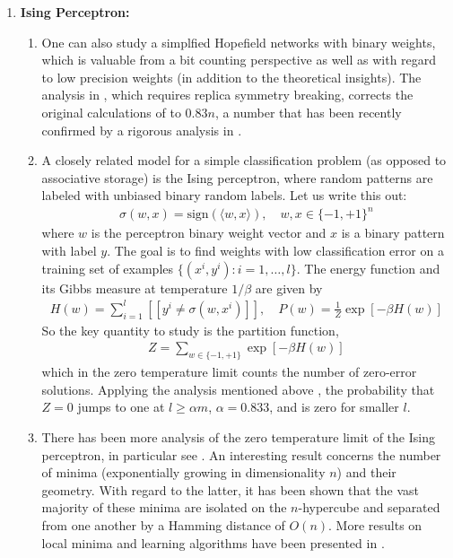 \documentclass[10pt,a4pape]{article}
\begin{document}
\begin{enumerate}
\begin{enumerate}
\end{enumerate}
\item {\textbf{Ising Perceptron:}} 
\begin{enumerate}
\item 
One can also study a simplfied Hopefield networks with binary weights, which is valuable from a bit counting perspective as well as with regard to low precision weights (in addition to the theoretical insights). The analysis in \cite{krauth1989storage}, which requires replica symmetry breaking, corrects the original calculations of  \cite{gardner1988optimal} to $0.83n$, a number that has been recently confirmed by a rigorous analysis in \cite{ding2018capacity}. 
\item A closely related model for a simple classification problem (as opposed to associative storage) is the Ising perceptron, where random patterns are labeled with unbiased binary random labels. Let us write this out:
\begin{align}
\sigma(w,x) = \text{sign}(\langle w,x\rangle), \quad w,x \in \{-1,+1\}^n
\end{align}
where $w$ is the perceptron binary weight vector and $x$ is a binary pattern with label $y$. The goal is to find weights with low classification error on a training set of examples $\{(x^i,y^i): i=1,\dots,l\}$. The energy function and its Gibbs measure at temperature $1/\beta$ are given by
\begin{align}
H(w) = \sum_{i=1}^l [[ y^i \neq \sigma(w,x^i)]], \quad P(w) = \frac 1Z \exp\left[-\beta H(w) \right]
\end{align}
So the key quantity to study is the partition function,
\begin{align}
Z  = \sum_{w \in \{-1,+1\}} \exp\left[-\beta H(w) \right]
\end{align} 
which in the zero temperature limit counts the number of zero-error solutions. Applying the analysis mentioned above \cite{krauth1989storage,ding2018capacity}, the probability that $Z =0$ jumps to one at $l  \ge \alpha m$, $\alpha = 0.833$, and is zero for smaller $l$.
\item 
There has been more analysis of the zero temperature limit of the Ising perceptron, in particular see \cite{huang2014origin}. An interesting result concerns the number of minima (exponentially growing in dimensionality $n$) and their geometry. With regard to the latter, it has been shown that the vast majority of these minima are isolated on the $n$-hypercube and separated from one another by a Hamming distance of $O(n)$. More results on local minima and learning algorithms have been presented in \cite{horner1992dynamics,braunstein2006learning, baldassi2007efficient, baldassi2009generalization}.
\end{enumerate}
\newpage

%



% 
%
\end{enumerate}
\end{document}
